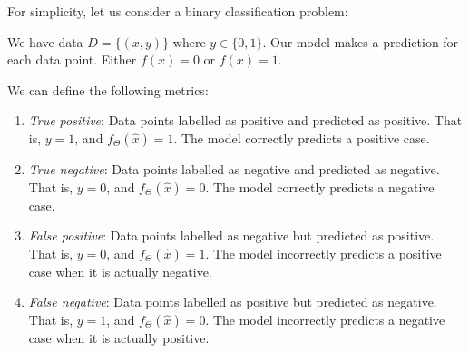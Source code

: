 \documentclass[a4paper, 12pt]{book}
\begin{document}
For simplicity, let us consider a binary classification problem:
\begin{problem}
    We have data $D = \{(x, y)\}$ where $y \in \{0, 1\}$. Our model makes a prediction for each data point. Either $f(x) = 0$ or $f(x) = 1$.
\end{problem}
We can define the following metrics:
\begin{enumerate}
    \item \emph{True positive}: Data points labelled as positive and predicted as positive. That is, $y=1$, and $f_{\Theta}(\hat{x}) = 1$. The model correctly predicts a positive case.
    \item \emph{True negative}: Data points labelled as negative and predicted as negative. That is, $y = 0$, and $f_{\Theta}(\hat{x}) = 0$. The model correctly predicts a negative case.
    \item \emph{False positive}: Data points labelled as negative but predicted as positive. That is, $y = 0$, and $f_{\Theta}(\hat{x}) = 1$. The model incorrectly predicts a positive case when it is actually negative.
    \item \emph{False negative}: Data points labelled as positive but predicted as negative. That is, $y = 1$, and $f_{\Theta}(\hat{x}) = 0$. The model incorrectly predicts a negative case when it is actually positive.
\end{enumerate}
\end{document}
